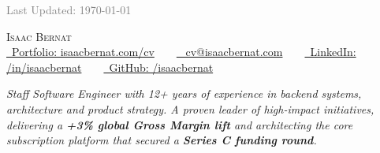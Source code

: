 \documentclass[a4paper,11pt]{article}
\begin{document}

\noindent\textcolor{grey}{\small\hfill Last Updated: \today}
\vspace{-1em} %

\begin{center}
    {\Huge \scshape Isaac Bernat} \\ \vspace{1pt}
    \small 
    \href{https://www.isaacbernat.com/cv}{\raisebox{-0.1\height}\faLink\ Portfolio: isaacbernat.com/cv} ~ \textbullet ~
    \href{mailto:cv@isaacbernat.com}{\raisebox{-0.1\height}\faEnvelope\ 
    cv@isaacbernat.com} ~ \textbullet ~
    \href{https://linkedin.com/in/isaacbernat}{\raisebox{-0.1\height}\faLinkedin\ LinkedIn: /in/isaacbernat} ~ \textbullet ~
    \href{https://github.com/isaacbernat}{\raisebox{-0.1\height}\faGithub\ GitHub: /isaacbernat}
    \vspace{-8pt}
\end{center}



\vspace{0.2em} %
\begin{center}
    \begin{minipage}{0.85\textwidth} %
        \small \textit{Staff Software Engineer with 12+ years of experience in backend systems, architecture and product strategy. A proven leader of high-impact initiatives, delivering a \textbf{+3\% global Gross Margin lift} and architecting the core subscription platform that secured a \textbf{Series C funding round}.}        
    \end{minipage}
\end{center}
\vspace{-0.7em} %
\end{document}
